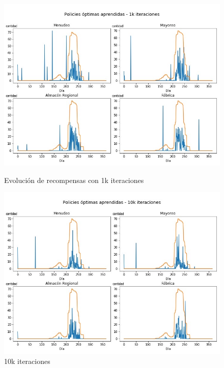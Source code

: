 \begin{figure}[!htb]
   \begin{minipage}{0.48\textwidth}
     \centering
     \includegraphics[width=1\linewidth]{tesis_tex/figs/policyiteration_policies_1000.png}
     \caption{Evoluci\'on de recompensas con 1k iteraciones}\label{politer_policies_1000}
   \end{minipage}\hfill
   \begin{minipage}{0.48\textwidth}
     \centering
     \includegraphics[width=1\linewidth]{tesis_tex/figs/policyiteration_policies_10000.png}
     \caption{10k iteraciones}\label{politer_policies_10000}
   \end{minipage}
\end{figure}

